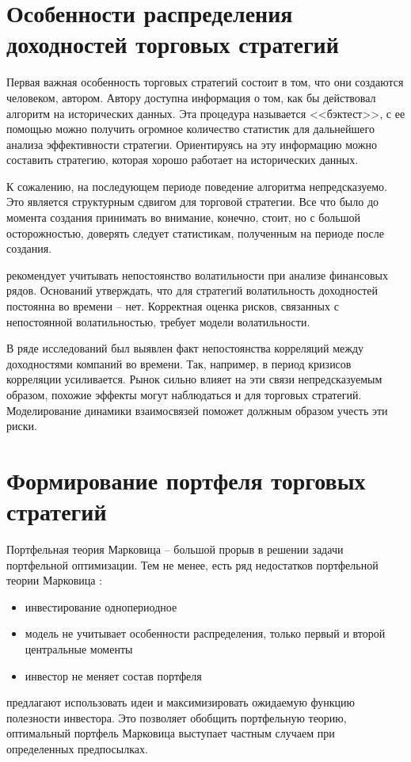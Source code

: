 \section{Особенности распределения доходностей торговых стратегий}
Первая важная особенность торговых стратегий состоит в том, что они создаются человеком, автором. Автору доступна информация о том, как бы действовал алгоритм на исторических данных. Эта процедура называется <<бэктест>>, с ее помощью можно получить огромное количество статистик для дальнейшего анализа эффективности стратегии. Ориентируясь на эту информацию можно составить стратегию, которая хорошо работает на исторических данных. 

К сожалению, на последующем периоде поведение алгоритма непредсказуемо. Это является структурным сдвигом для торговой стратегии. Все что было до момента создания принимать во внимание, конечно, стоит, но с большой осторожностью, доверять следует статистикам, полученным на периоде после создания.
 
\citep{dumas1998} рекомендует учитывать непостоянство волатильности при анализе финансовых рядов. Оснований утверждать, что для стратегий волатильность доходностей постоянна во времени -- нет. Корректная оценка рисков, связанных с непостоянной волатильностью, требует модели волатильности.

В ряде исследований \citep{vaga1990, oral2017} был выявлен факт непостоянства корреляций между доходностями компаний во времени. Так, например, в период кризисов корреляции усиливается. Рынок сильно влияет на эти связи непредсказуемым образом, похожие эффекты могут наблюдаться и для торговых стратегий. Моделирование динамики взаимосвязей поможет должным образом учесть эти риски.
\section{Формирование портфеля торговых стратегий}

Портфельная теория Марковица \citep{markovitz1959} -- большой прорыв в решении задачи портфельной оптимизации.
Тем не менее, есть ряд недостатков портфельной теории Марковица \citep{lorenz2008thesis}:
\begin{itemize}
	\item инвестирование однопериодное
	\item модель не учитывает особенности распределения, только первый и второй центральные моменты
	\item инвестор не меняет состав портфеля
\end{itemize}
\cite{lorenz2008thesis, bucciol2006} предлагают использовать идеи \cite{neumann1944} и максимизировать ожидаемую функцию полезности инвестора. Это позволяет обобщить портфельную теорию, оптимальный портфель Марковица выступает частным случаем при определенных предпосылках.


